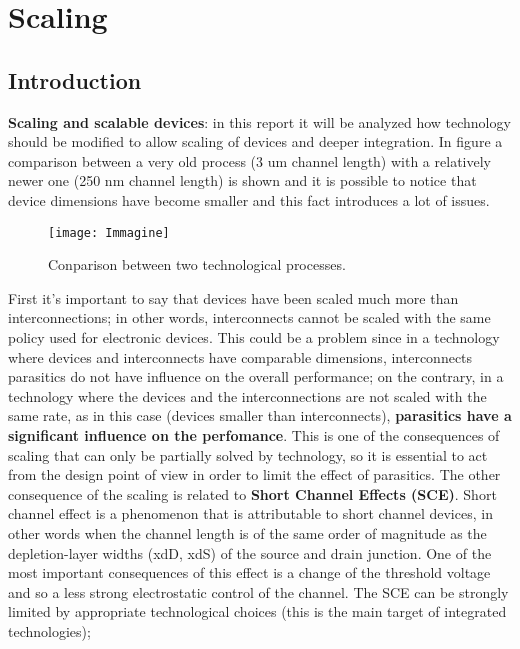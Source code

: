 \documentclass[a4paper, 12pt, twoside, openright]{report}
\begin{document}
\tableofcontents

\chapter{Scaling}

\section{Introduction}

\textbf{Scaling and scalable devices}: in this report it will be analyzed how technology should be modified to allow scaling of devices and deeper integration.
In figure \label{confronto} a comparison between a very old process (3 um channel length) with a relatively newer one (250 nm channel length) is shown and it is possible to notice that device dimensions have become smaller and this fact introduces a lot of issues.

	\begin{figure}[h]
	\centering
	\texttt{[image: Immagine]}
	\caption{Conparison between two technological processes.}
	\label{confronto}
	\end{figure}

First it's important to say that devices have been scaled much more than interconnections; in other words, interconnects cannot be scaled with the same policy used for electronic devices. This could be a problem since in a technology where devices and interconnects have comparable dimensions, interconnects parasitics do not have influence on the overall performance; on the contrary, in a technology where the devices and the interconnections are not scaled with the same rate, as in this case (devices smaller than interconnects), \textbf{parasitics have a significant influence on the perfomance}. This is one of the consequences of scaling that can only be partially solved by technology, so it is essential to act from the design point of view in order to limit the effect of parasitics. The other consequence of the scaling is related to \textbf{Short Channel Effects (SCE)}. Short channel effect is a phenomenon that is attributable to short channel devices, in other words when the channel length is of the same order of magnitude as the depletion-layer widths (xdD, xdS) of the source and drain junction. One of the most important consequences of this effect is a change of the threshold voltage and so a less strong electrostatic control of the channel. The SCE can be strongly limited by appropriate technological choices (this is the main target of integrated technologies); \\
\end{document}
